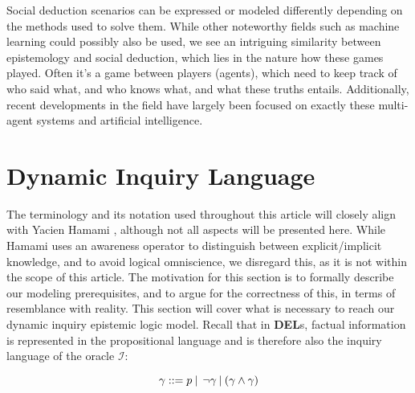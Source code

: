 Social deduction scenarios can be expressed or modeled differently depending on the methods used to solve them. While other noteworthy fields such as machine learning could possibly also be used, we see an intriguing similarity between epistemology and social deduction, which lies in the nature how these games played. Often it's a game between players (agents), which need to keep track of who said what, and who knows what, and what these truths entails. Additionally, recent developments in the field have largely been focused on exactly these multi-agent systems and artificial intelligence. 

\section{Dynamic Inquiry Language}
The terminology and its notation used throughout this article will closely
align with Yacien Hamami \cite{delimi}, although not all aspects will be
presented here. While Hamami uses an awareness operator to distinguish between explicit/implicit knowledge, and to avoid logical omniscience, we disregard this, as it is not within the scope of this article. \newline
The motivation for this section is to formally describe our
modeling prerequisites, and to argue for the correctness of this, in terms of
resemblance with reality. This section will cover what is necessary to reach
our dynamic inquiry epistemic logic model. Recall that in \textbf{DEL}s,
factual information is represented in the propositional language and is
therefore also the inquiry language of the oracle $\mathscr{I}$: 

$$ 
\gamma::= p \:|\:\:\neg\gamma\:|\:(\gamma\land\gamma) 
$$

